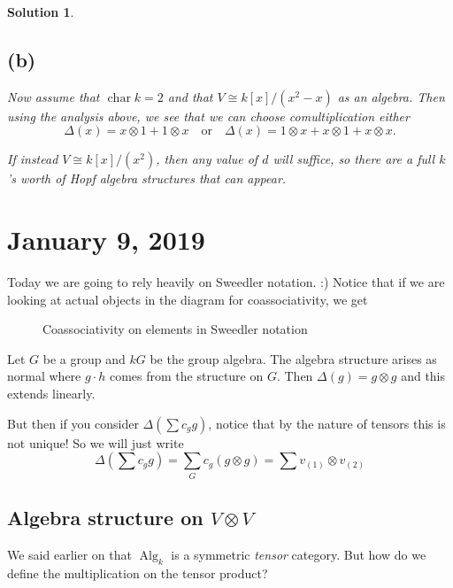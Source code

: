 \documentclass[12pt]{article}
\theoremstyle{break}
\theoremstyle{nonumberbreak}
\newtheorem{sol}{Solution}
\theoremstyle{changebreak}
\theoremstyle{break}
\theoremstyle{nonumberbreak}
\theoremstyle{nonumberplain}
\theoremstyle{change}
\DeclareMathOperator{\ch}{char}
\newcommand*{\Algk}{\operatorname{Alg}_k}
\begin{document}
\begin{sol}
	\subsection*{(b)}
	Now assume that $\ch k=2$ and that $V\cong k[x]/(x^2-x)$ as an algebra. Then using the analysis above, 
	we see that we can choose comultiplication either
	\[\Delta(x)=x\otimes 1+1\otimes x\quad\text{or}\quad \Delta(x)=1\otimes x+x\otimes 1+x\otimes x.\]

	If instead $V\cong k[x]/(x^2)$, then \textit{any} value of $d$ will suffice, so there are a full $k$'s worth
	of Hopf algebra structures that can appear.
\end{sol} 

\section{January 9, 2019}
Today we are going to rely heavily on Sweedler notation. :) Notice that if we are looking at actual objects in the 
diagram for coassociativity, we get
\begin{figure}[h]
	\centering
	\caption{Coassociativity on elements in Sweedler notation}
\end{figure}

\begin{ex}
	Let $G$ be a group and $kG$ be the group algebra. The algebra structure arises as normal
	where $g\cdot h$ comes from the structure on $G$. Then $\Delta(g)=g\otimes g$ and this extends linearly.

	But then if you consider $\Delta(\sum c_gg)$, notice that by the nature of tensors this is not unique!
	So we will just write
	\[\Delta\left(\sum c_gg\right)=\sum_Gc_g(g\otimes g)=\sum v_{(1)}\otimes v_{(2)}\]
\end{ex}

\subsection{Algebra structure on $V\otimes V$}
We said earlier on that $\Algk$ is a symmetric \textit{tensor} category. But how do we
define the multiplication on the tensor product?
\end{document}

